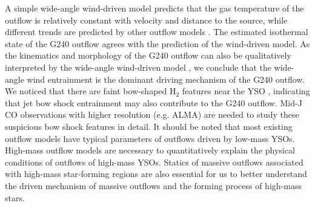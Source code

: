 A simple wide-angle wind-driven model predicts that the gas temperature of the outflow is relatively constant with velocity and distance to the source, while different trends are predicted by other outflow models \citep{2007prpl.conf..245A}. The estimated isothermal state of the G240 outflow agrees with the prediction of the wind-driven model. As the kinematics and morphology of the G240 outflow can also be qualitatively interpreted by the wide-angle wind-driven model \citep{2009ApJ...696...66Q}, we conclude that the wide-angle wind entrainment is the dominant driving mechanism of the G240 outflow.  We noticed that there are faint bow-shaped H$_{2}$ features near the YSO  \citet{2002ApJ...576..313K}, indicating that jet bow shock entrainment may also contribute to the G240 outflow. Mid-J CO observations with higher resolution (e.g. ALMA) are needed to study these suspicious bow shock features in detail. It should be noted that most existing outflow models have typical parameters of outflows driven by low-mass YSOs. High-mass outflow models are necessary to quantitatively explain the physical conditions of outflows of high-mass YSOs. Statics of massive outflows associated with high-mass star-forming regions are also essential for us to better understand the driven mechanism of massive outflows and the forming process of high-mass stars.

